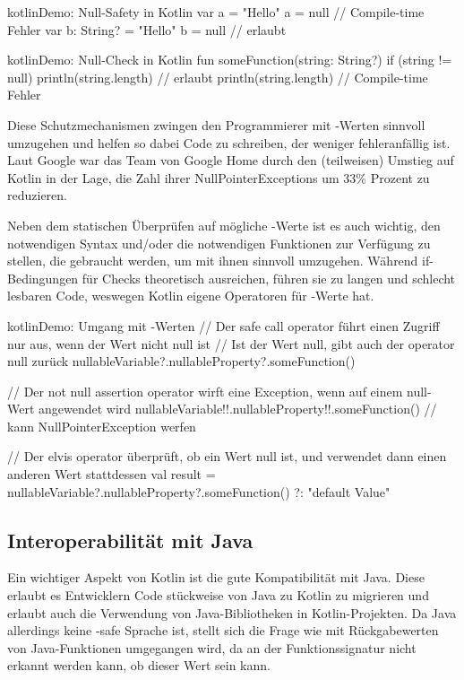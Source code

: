 \begin{codeBlock}{kotlin}{Demo: Null-Safety in Kotlin}
var a = "Hello"
a = null // Compile-time Fehler
var b: String? = "Hello"
b = null // erlaubt
\end{codeBlock}

\begin{codeBlock}{kotlin}{Demo: Null-Check in Kotlin}
    fun someFunction(string: String?) {
        if (string != null) println(string.length) // erlaubt
        println(string.length) // Compile-time Fehler
    }
\end{codeBlock}

Diese Schutzmechanismen zwingen den Programmierer mit -Werten sinnvoll umzugehen und helfen so dabei
Code zu schreiben, der weniger fehleranfällig ist.
Laut Google war das Team von Google Home durch den (teilweisen) Umstieg auf Kotlin in der Lage, die Zahl ihrer
NullPointerExceptions um 33\% Prozent zu reduzieren.

Neben dem statischen Überprüfen auf mögliche -Werte ist es auch wichtig, den notwendigen
Syntax und/oder die notwendigen Funktionen zur Verfügung zu stellen, die gebraucht werden, um mit ihnen sinnvoll
umzugehen.
Während if-Bedingungen für  Checks theoretisch ausreichen, führen sie zu langen und schlecht lesbaren
Code, weswegen Kotlin eigene Operatoren für -Werte hat.

\begin{codeBlock}{kotlin}{Demo: Umgang mit -Werten}
// Der safe call operator führt einen Zugriff nur aus, wenn der Wert nicht null ist
// Ist der Wert null, gibt auch der operator null zurück
nullableVariable?.nullableProperty?.someFunction()

// Der not null assertion operator wirft eine Exception, wenn auf einem null-Wert angewendet wird
nullableVariable!!.nullableProperty!!.someFunction() // kann NullPointerException werfen

// Der elvis operator überprüft, ob ein Wert null ist, und verwendet dann einen anderen Wert stattdessen
val result = nullableVariable?.nullableProperty?.someFunction() ?: "default Value"
\end{codeBlock}

\subsection{Interoperabilität mit Java}
Ein wichtiger Aspekt von Kotlin ist die gute Kompatibilität mit Java.
Diese erlaubt es Entwicklern Code stückweise von Java zu Kotlin zu migrieren und erlaubt auch die Verwendung von
Java-Bibliotheken in Kotlin-Projekten.
Da Java allerdings keine -safe Sprache ist, stellt sich die Frage wie mit Rückgabewerten von
Java-Funktionen umgegangen wird, da an der Funktionssignatur nicht erkannt werden kann, ob dieser Wert
 sein kann.

